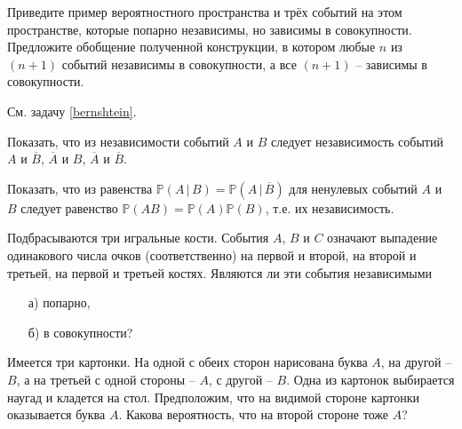 
\begin{problem}
Приведите пример вероятностного пространства и трёх событий на этом пространстве, которые попарно независимы, но зависимы в совокупности. Предложите обобщение полученной конструкции, в котором любые $n$ из $(n+1)$ событий независимы в совокупности, а все $(n+1)$ -- зависимы в совокупности.
\end{problem}

\begin{ordre}
См. задачу \ref{bernshtein}.
\end{ordre}

\begin{problem}
Показать, что из независимости событий $A$ и $B$ следует независимость событий $A$ и $\overline B$, $\overline A$ и $B$, 
$\overline A$ и $\overline B$. 
\end{problem}


\begin{problem}
Показать, что из равенства ${\mathbb P}(A\, |\, B)={\mathbb P}(A\, |\, \overline B)$ для ненулевых событий $A$ и $B$ следует 
равенство ${\mathbb P}(AB)={\mathbb P}(A){\mathbb P}(B)$, т.е. их независимость. 
\end{problem}


\begin{problem}
\label{bernshtein}
Подбрасываются три игральные кости. События $A$, $B$ и $C$ означают выпадение одинакового числа очков (соответственно) на первой и 
второй, на второй и третьей, на первой и третьей костях. Являются ли эти события независимыми 
\begin{enumerate}
\item[а)] попарно, 
\item[б)] в совокупности? 
\end{enumerate}
\end{problem}


\begin{problem}
Имеется три картонки. На одной с обеих сторон нарисована буква $A$, на другой -- $B$, а на третьей с одной стороны -- $A$, с другой -- $B$. Одна из картонок выбирается наугад и кладется на стол. Предположим, что на видимой стороне картонки оказывается буква $A$. Какова вероятность, что на второй стороне тоже $A$?  
\end{problem}

